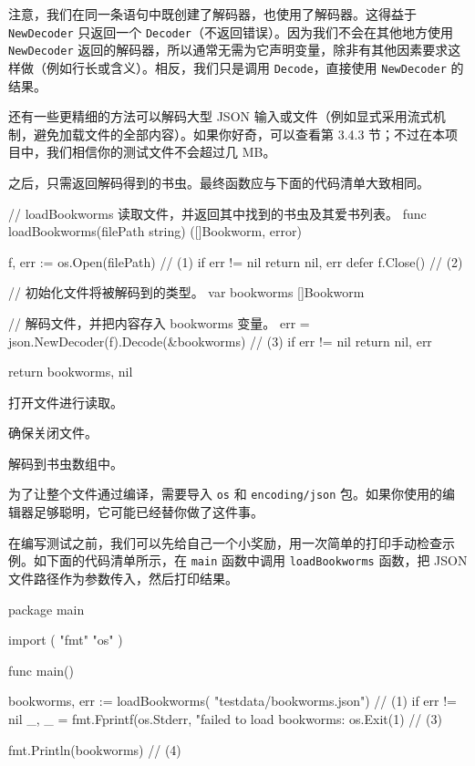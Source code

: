 注意，我们在同一条语句中既创建了解码器，也使用了解码器。这得益于 \texttt{NewDecoder} 只返回一个 \texttt{Decoder}（不返回错误）。因为我们不会在其他地方使用 \texttt{NewDecoder} 返回的解码器，所以通常无需为它声明变量，除非有其他因素要求这样做（例如行长或含义）。相反，我们只是调用 \texttt{Decode}，直接使用 \texttt{NewDecoder} 的结果。

还有一些更精细的方法可以解码大型 JSON 输入或文件（例如显式采用流式机制，避免加载文件的全部内容）。如果你好奇，可以查看第 3.4.3 节；不过在本项目中，我们相信你的测试文件不会超过几 MB。

之后，只需返回解码得到的书虫。最终函数应与下面的代码清单大致相同。

\begin{gocode}[title={代码清单 3.6 \texttt{bookworm.go}：\texttt{loadBookworms()} 解析 JSON 文件}]
// loadBookworms 读取文件，并返回其中找到的书虫及其爱书列表。
func loadBookworms(filePath string) ([]Bookworm, error) {
    f, err := os.Open(filePath) // (1)
    if err != nil {
        return nil, err
    }
    defer f.Close() // (2)

    // 初始化文件将被解码到的类型。
    var bookworms []Bookworm

    // 解码文件，并把内容存入 bookworms 变量。
    err = json.NewDecoder(f).Decode(&bookworms) // (3)
    if err != nil {
        return nil, err
    }

    return bookworms, nil
}
\end{gocode}

\begin{codeannotations}
  \item 打开文件进行读取。
  \item 确保关闭文件。
  \item 解码到书虫数组中。
\end{codeannotations}

为了让整个文件通过编译，需要导入 \texttt{os} 和 \texttt{encoding/json} 包。如果你使用的编辑器足够聪明，它可能已经替你做了这件事。

在编写测试之前，我们可以先给自己一个小奖励，用一次简单的打印手动检查示例。如下面的代码清单所示，在 \texttt{main} 函数中调用 \texttt{loadBookworms} 函数，把 JSON 文件路径作为参数传入，然后打印结果。

\begin{gocode}[title={代码清单 3.7 \texttt{main.go}：在 \texttt{main()} 中调用 \texttt{loadBookworms()}}]
package main

import (
    "fmt"
    "os"
)

func main() {
    bookworms, err := loadBookworms(
        "testdata/bookworms.json") // (1)
    if err != nil {
        _, _ = fmt.Fprintf(os.Stderr,
            "failed to load bookworms: %
        os.Exit(1) // (3)
    }

    fmt.Println(bookworms) // (4)
}
\end{gocode}

